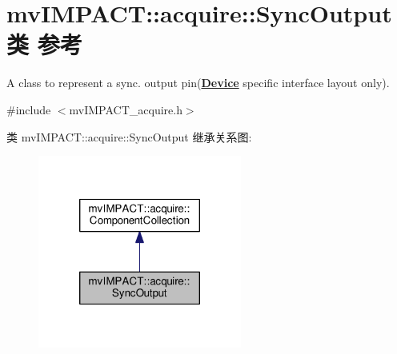 \hypertarget{classmv_i_m_p_a_c_t_1_1acquire_1_1_sync_output}{\section{mv\+I\+M\+P\+A\+C\+T\+:\+:acquire\+:\+:Sync\+Output类 参考}
\label{classmv_i_m_p_a_c_t_1_1acquire_1_1_sync_output}
}


A class to represent a sync. output pin({\bfseries \hyperlink{classmv_i_m_p_a_c_t_1_1acquire_1_1_device}{Device}} specific interface layout only).  




{\ttfamily \#include $<$mv\+I\+M\+P\+A\+C\+T\+\_\+acquire.\+h$>$}



类 mv\+I\+M\+P\+A\+C\+T\+:\+:acquire\+:\+:Sync\+Output 继承关系图\+:
\nopagebreak
\begin{figure}[H]
\begin{center}
\leavevmode
\includegraphics[width=190pt]{classmv_i_m_p_a_c_t_1_1acquire_1_1_sync_output__inherit__graph}
\end{center}
\end{figure}


